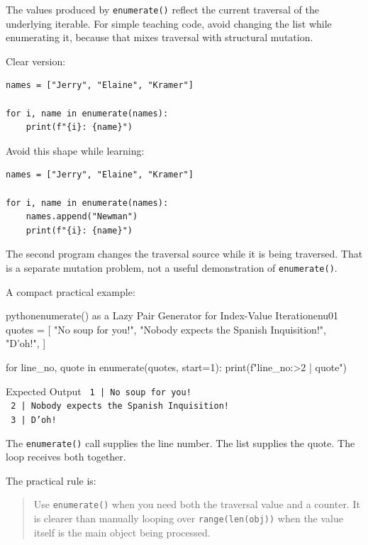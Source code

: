 \documentclass[a4paper,twoside]{report}
\begin{document}
The values produced by \texttt{enumerate()} reflect the current traversal of the underlying iterable. For simple teaching code, avoid changing the list while enumerating it, because that mixes traversal with structural mutation.

Clear version:

\begin{verbatim}
names = ["Jerry", "Elaine", "Kramer"]

for i, name in enumerate(names):
    print(f"{i}: {name}")
\end{verbatim}

Avoid this shape while learning:

\begin{verbatim}
names = ["Jerry", "Elaine", "Kramer"]

for i, name in enumerate(names):
    names.append("Newman")
    print(f"{i}: {name}")
\end{verbatim}

The second program changes the traversal source while it is being traversed. That is a separate mutation problem, not a useful demonstration of \texttt{enumerate()}.

A compact practical example:

\begin{codebox}[]{python}{enumerate() as a Lazy Pair Generator for Index-Value Iteration}{enu01}
quotes = [
    "No soup for you!",
    "Nobody expects the Spanish Inquisition!",
    "D'oh!",
]

for line_no, quote in enumerate(quotes, start=1):
    print(f"{line_no:>2} | {quote}")
\end{codebox}


\begin{iobox}{Expected Output}
\texttt{ 1 | No soup for you!} \\
\texttt{ 2 | Nobody expects the Spanish Inquisition!} \\
\texttt{ 3 | D'oh!} \\
\end{iobox}


The \texttt{enumerate()} call supplies the line number. The list supplies the quote. The loop receives both together.

The practical rule is:

\begin{quote}
Use \texttt{enumerate()} when you need both the traversal value and a counter. It is clearer than manually looping over \texttt{range(len(obj))} when the value itself is the main object being processed.
\end{quote}
\end{document}

